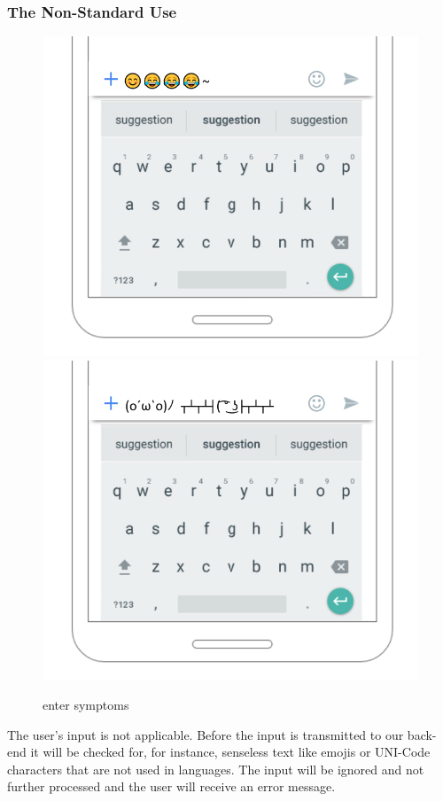 \subsubsection{The Non-Standard Use}
\begin{minipage}{0.4\textwidth}
\begin{figure}[H]
\centering
\includegraphics[scale=.7]{SystemSpec/Usecases/Mocks/entersym02Non.png}\\
\includegraphics[scale=.7]{SystemSpec/Usecases/Mocks/entersym02NonAscii.png}\\
\caption{\label{fig:blue_rectangle}enter symptoms}
\end{figure}
\end{minipage} \hfill
\begin{minipage}{0.6\textwidth}
The user's input is not applicable. Before the input is transmitted to our back-end it will be checked for, for instance, senseless text like emojis or UNI-Code characters that are not used in languages. The input will be ignored and not further processed and the user will receive an error message.
\end{minipage}

\pagebreak
